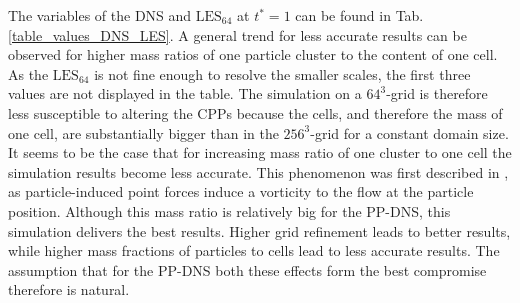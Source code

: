 \documentclass[11pt,a4paper,openany,oneside,parskip=half*]{article}
\begin{document}
The variables of the DNS and $\mathrm{LES_{64}}$ at $t^* = 1$ can be found in Tab.\ref{table_values_DNS_LES}. A general trend for less accurate results can be observed for higher mass ratios of one particle cluster to the content of one cell. As the $\mathrm{LES_{64}}$ is not fine enough to resolve the smaller scales, the first three values are not displayed in the table. The simulation on a $64^3$-grid is therefore less susceptible to altering the CPPs because the cells, and therefore the mass of one cell, are substantially bigger than in the $256^3$-grid for a constant domain size. It seems to be the case that for increasing mass ratio of one cluster to one cell the simulation results become less accurate. This phenomenon was first described in \cite{maxey1997simulations}, as particle-induced point forces induce a vorticity to the flow at the particle position. 
\newline
Although this mass ratio is relatively big for the PP-DNS, this simulation delivers the best results. Higher grid refinement leads to better results, while higher mass fractions of particles to cells lead to less accurate results. The assumption that for the PP-DNS both these effects form the best compromise therefore is natural. 
\end{document}
